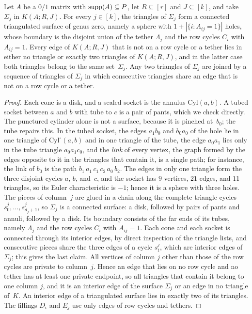 \begin{lemma}\label{lem:surface}
Let $A$ be a $0/1$ matrix with $\operatorname{supp}(A)\subseteq P$, let $R\subseteq[r]$ and $J\subseteq[k]$, and take $\Sigma_j$ in $K(A;R,J)$.
For every $j\in[k]$, the triangles of $\Sigma_j$ form a connected triangulated surface of genus zero, namely a sphere with $1+|\{i:A_{ij}=1\}|$ holes, whose boundary is the disjoint union of the tether $\Lambda_j$ and the row cycles $C_i$ with $A_{ij}=1$.
Every edge of $K(A;R,J)$ that is not on a row cycle or a tether lies in either no triangle or exactly two triangles of $K(A;R,J)$, and in the latter case both triangles belong to the same set~$\Sigma_j$.
Any two triangles of $\Sigma_j$ are joined by a sequence of triangles of $\Sigma_j$ in which consecutive triangles share an edge that is not on a row cycle or a tether.
\end{lemma}

\begin{proof}
Each cone is a disk, and a sealed socket is the annulus $\mathrm{Cyl}(a,b)$.
A tubed socket between $a$ and $b$ with tube to $c$ is a pair of pants, which we check directly.
The punctured cylinder alone is not a surface, because it is pinched at~$b_0$; the tube repairs this.
In the tubed socket, the edges $a_1b_0$ and $b_0a_0$ of the hole lie in one triangle of $\mathrm{Cyl}^{\circ}(a,b)$ and in one triangle of the tube, the edge $a_0a_1$ lies only in the tube triangle $a_0a_1c_0$, and the \emph{link} of every vertex, the graph formed by the edges opposite to it in the triangles that contain it, is a single path; for instance, the link of $b_0$ is the path $b_1\,a_1\,c_1\,c_2\,a_0\,b_2$.
The edges in only one triangle form the three disjoint cycles $a$, $b$, and~$c$, and the socket has $9$ vertices, $21$ edges, and $11$ triangles, so its Euler characteristic is $-1$; hence it is a sphere with three holes.
The pieces of column~$j$ are glued in a chain along the complete triangle cycles $s^j_0,\dots,s^j_{d_j+1}$, so $\Sigma_j$ is a connected surface: a disk, followed by pairs of pants and annuli, followed by a disk.
Its boundary consists of the far ends of its tubes, namely $\Lambda_j$ and the row cycles $C_i$ with $A_{ij}=1$.
Each cone and each socket is connected through its interior edges, by direct inspection of the triangle lists, and consecutive pieces share the three edges of a cycle $s^j_t$, which are interior edges of~$\Sigma_j$; this gives the last claim.
All vertices of column $j$ other than those of the row cycles are private to column~$j$.
Hence an edge that lies on no row cycle and no tether has at least one private endpoint, so all triangles that contain it belong to one column $j$, and it is an interior edge of the surface $\Sigma_j$ or an edge in no triangle of~$K$.
An interior edge of a triangulated surface lies in exactly two of its triangles.
The fillings $D_i$ and $E_j$ use only edges of row cycles and tethers.
\end{proof}

